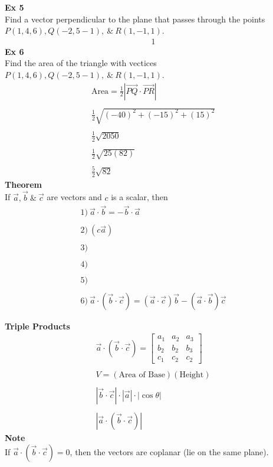 \documentclass{article}
\begin{document}
    \textbf{Ex 5}\\
    Find a vector perpendicular to the plane that passes through the points $ P(1,4,6), Q(-2,5-1), ~\&~ R(1,-1,1) $. 
    \[
      \begin{aligned}
        1
      \end{aligned}
    \]
    \textbf{Ex 6}\\
    Find the area of the triangle with vectices $ P(1,4,6), Q(-2,5-1), ~\&~ R(1,-1,1) $.
    \[
      \begin{aligned}
      \text{Area}=\frac{1}{2} | \vec{PQ} \cdot  \vec{PR}|\\
      ~\\
      \frac{1}{2} \sqrt{(-40)^{2} + (-15)^{2}+(15)^{2}   }\\
      ~\\
      \frac{1}{2} \sqrt{2050}\\
      ~\\
      \frac{1}{2} \sqrt{25(82)}\\
      ~\\
      \boxed{\frac{5}{2}\sqrt{82} }
      \end{aligned}
    \]
    \textbf{Theorem}\\
    If $ \vec{a}, \vec{b} ~\&~ \vec{c}$ are vectors and $ c$ is a scalar, then
    \[
      \begin{gathered}
      1)~\vec{a} \cdot \vec{b} = -\vec{b} \cdot  \vec{a}\\
      ~\\
      2)~(c\vec{a})\\
      ~\\
      3)~ \\
      ~\\
      4)~\\
      ~\\
      5)~ \\
      ~\\
      6)~\vec{a} \cdot (\vec{b} \cdot  \vec{c}) = (\vec{a} \cdot  \vec{c})\vec{b} - (\vec{a} \cdot  \vec{b})\vec{c}
      \end{gathered}
    \]

    \textbf{Triple Products}
    \[
      \begin{gathered}
      \vec{a} \cdot  (\vec{b} \cdot \vec{c}) = 
      \begin{bmatrix}
        a_{1} &a_{2} &a_{3}\\
        b_{2} &b_{2} &b_{3}\\
        c_{1} &c_{2} &c_{2} 
      \end{bmatrix}\\
      ~\\
      V = (\text{Area of Base})(\text{Height})\\
      ~\\
      | \vec{b} \cdot \vec{c} | \cdot  | \vec{a} | \cdot  | \cos{\theta} |\\
      ~\\
      | \vec{a} \cdot  (\vec{b} \cdot  \vec{c}) |
      \end{gathered}
    \]
    \textbf{Note}\\
    If $ \vec{a} \cdot (\vec{b} \cdot  \vec{c}) = 0$, then the vectors are coplanar (lie on the same plane).
\end{document}
